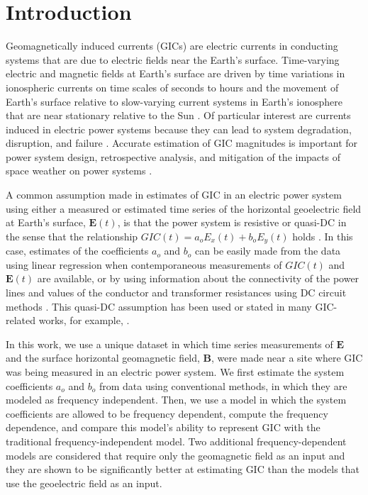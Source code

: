 \documentclass[draft,linenumbers]{agujournal2018}
\begin{document}
\section{Introduction}

Geomagnetically induced currents (GICs) are electric currents in conducting systems that are due to electric fields near the Earth's surface. Time-varying electric and magnetic fields at Earth's surface are driven by time variations in ionospheric currents on time scales of seconds to hours \citep{Ohtani2000} and the movement of Earth's surface relative to slow-varying current systems in Earth's ionosphere that are near stationary relative to the Sun \citep{Stening2013}. Of particular interest are currents induced in electric power systems because they can lead to system degradation, disruption, and failure \citep{Albertson1993,NERC2012,Gaunt2014}. Accurate estimation of GIC magnitudes is important for power system design, retrospective analysis, and mitigation of the impacts of space weather on power systems \citep{Molinski2002,Thomson2010,NERC2012,Gaunt2014}.

A common assumption made in estimates of GIC in an electric power system using either a measured or estimated time series of the horizontal geoelectric field at Earth's surface, $\mathbf{E}(t)$, is that the power system is resistive or quasi-DC in the sense that the relationship $GIC(t) = a_oE_x(t) + b_oE_y(t)$ holds \citep{Albertson1981,Lehtinen1985}. In this case, estimates of the coefficients $a_o$ and $b_o$ can be easily made from the data using linear regression when contemporaneous measurements of $GIC(t)$ and $\mathbf{E}(t)$ are available, or by using information about the connectivity of the power lines and values of the conductor and transformer resistances using DC circuit methods \citep[e.g.,][]{Boteler2014a,Boteler2014b,Boteler2017}. This quasi-DC assumption has been used or stated in many GIC-related works, for example, \citet{Pulkkinen2007,Wik2008,Pirjola2009,Pulkkinen2010,Ngwira2011,Horton2012,Viljanen2012,Overbye2012,Marshall2013,Liu2014,Zheng2014,Watari2015}.

In this work, we use a unique dataset in which time series measurements of $\mathbf{E}$ and the surface horizontal geomagnetic field, $\mathbf{B}$, were made near a site where GIC was being measured in an electric power system.  We first estimate the system coefficients $a_o$ and $b_o$ from data using conventional methods, in which they are modeled as frequency independent. Then, we use a model in which the system coefficients are allowed to be frequency dependent, compute the frequency dependence, and compare this model's ability to represent GIC with the traditional frequency-independent model. Two additional frequency-dependent models are considered that require only the geomagnetic field as an input and they are shown to be significantly better at estimating GIC than the models that use the geoelectric field as an input.
\end{document}
